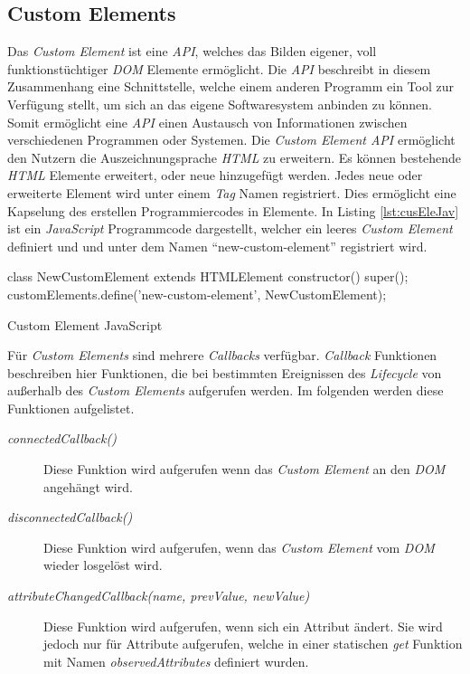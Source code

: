 \documentclass[12pt, paper=a4, bibtotoc, toc=listof]{scrreprt}
\begin{document}
			\subsection{Custom Elements}
			Das \emph{Custom Element} ist eine \emph{\ac{API}}, welches das Bilden eigener, voll funktionstüchtiger \emph{\ac{DOM}} Elemente ermöglicht. Die \emph{\ac{API}} beschreibt in diesem Zusammenhang eine Schnittstelle, welche einem anderen Programm ein Tool zur Verfügung stellt, um sich an das eigene Softwaresystem anbinden zu können. Somit ermöglicht eine \emph{\ac{API}} einen Austausch von Informationen zwischen verschiedenen Programmen oder Systemen.	
			Die \emph{Custom Element \ac{API}} ermöglicht den Nutzern die Auszeichnungsprache \emph{\ac{HTML}} zu erweitern. Es können bestehende \emph{\ac{HTML}} Elemente erweitert, oder neue hinzugefügt werden. Jedes neue oder erweiterte Element wird unter einem \emph{Tag} Namen registriert. Dies ermöglicht eine Kapselung des erstellen Programmiercodes in Elemente. In Listing \ref{lst:cusEleJav} ist ein \emph{JavaScript} Programmcode dargestellt, welcher ein leeres \emph{Custom Element} definiert und und unter dem Namen \enquote{new-custom-element} registriert wird.
			\begin{listing}
				\begin{JavaScriptcode*}{}
class NewCustomElement extends HTMLElement {
	constructor() {
		super();
	}
}
customElements.define('new-custom-element', NewCustomElement);
				\end{JavaScriptcode*}
				\caption{Custom Element JavaScript}
				\label{lst:cusEleJav}
			\end{listing}
			Für \emph{Custom Elements} sind mehrere \emph{Callbacks} verfügbar. \emph{Callback} Funktionen beschreiben hier Funktionen, die bei bestimmten Ereignissen des \emph{Lifecycle} von außerhalb des \emph{Custom Elements} aufgerufen werden. Im folgenden werden diese Funktionen aufgelistet.
			\begin{description}  
				\item  [\emph{connectedCallback()}] Diese Funktion wird aufgerufen wenn das \emph{Custom Element} an den \emph{\ac{DOM}} angehängt wird.
				\item [\emph{disconnectedCallback()}] Diese Funktion wird aufgerufen, wenn das \emph{Custom Element} vom \emph{\ac{DOM}} wieder losgelöst wird. 
				\item  [\emph{attributeChangedCallback(name, prevValue, newValue)}] Diese Funktion wird aufgerufen, wenn sich ein Attribut ändert. Sie wird jedoch nur für Attribute aufgerufen, welche in einer statischen \emph{get} Funktion mit Namen \emph{observedAttributes} definiert wurden.
			\end{description}
\end{document}
